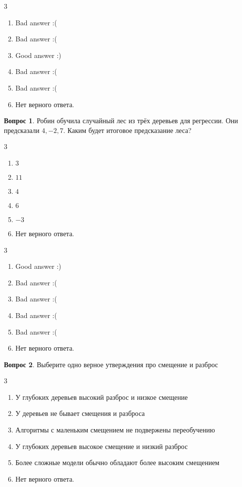 \documentclass[12pt]{article}
\newenvironment{answerlist}[1][3]{
\begin{multicols}{#1}

\begin{enumerate}[label=\fbox{\emph{\Alph*}},ref=\emph{\alph*}]
}
{
\item Нет верного ответа.
\end{enumerate}
\end{multicols}
}
\theoremstyle{definition}
\newtheorem{question}{Вопрос}
\begin{document}
\begin{solution}
\begin{answerlist}
  \item Bad answer :(
  \item Bad answer :(
  \item Good answer :)
  \item Bad answer :(
  \item Bad answer :(
\end{answerlist}
\end{solution}


\begin{question}
Робин обучила случайный лес из трёх деревьев для регрессии. Они предсказали $4, -2, 7.$ Каким будет итоговое предсказание леса? 
\begin{answerlist}
  \item  $3$
  \item  $11$
  \item  $4$
  \item  $6$
  \item  $-3$
\end{answerlist}
\end{question}

\begin{solution}
\begin{answerlist}
  \item Good answer :)
  \item Bad answer :(
  \item Bad answer :(
  \item Bad answer :(
  \item Bad answer :(
\end{answerlist}
\end{solution}


\begin{question}
Выберите одно верное утверждения про смещение и разброс
\begin{answerlist}
  \item У глубоких деревьев высокий разброс и низкое смещение
  \item У деревьев не бывает смещения и разброса
  \item Алгоритмы с маленьким смещением не подвержены переобучению
  \item У глубоких деревьев высокое смещение и низкий разброс
  \item Более сложные модели обычно обладают более высоким смещением
\end{answerlist}
\end{question}
\end{document}
